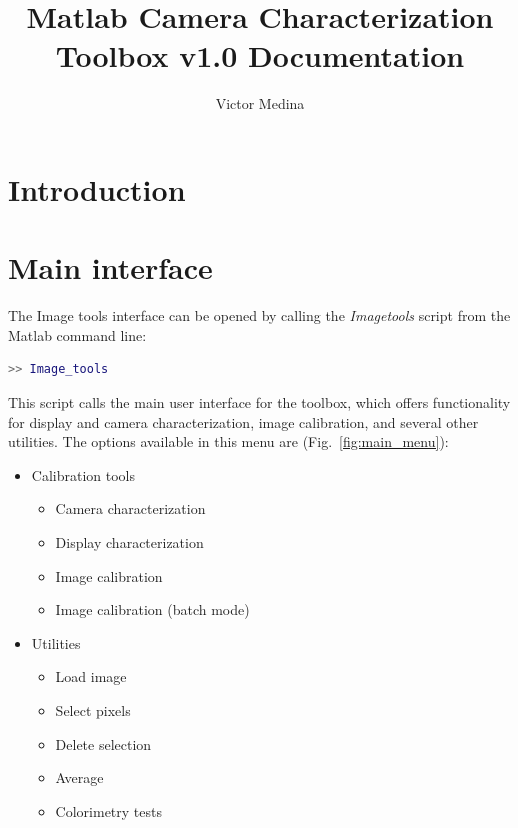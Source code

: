 \documentclass[a4paper,12pt,oneside]{article}
\begin{document}
\title{Matlab Camera Characterization Toolbox v1.0
	   \newline Documentation}
\author{Victor Medina}

\maketitle

\tableofcontents

\section{Introduction}


\section{Main interface}
The Image tools interface can be opened by calling the \textit{Image{\textunderscore}tools} script from the Matlab command line:

\begin{lstlisting}[language=matlab]
>> Image_tools
\end{lstlisting}

This script calls the main user interface for the toolbox, which offers functionality for display and camera characterization, image calibration, and several other utilities. The options available in this menu are (Fig.~\ref{fig:main_menu}):

\begin{itemize}
	\item Calibration tools
		\begin{itemize}
			\item Camera characterization
			\item Display characterization
			\item Image calibration
			\item Image calibration (batch mode)
		\end{itemize}
	
	\item Utilities
		\begin{itemize}
			\item Load image
			\item Select pixels
			\item Delete selection
			\item Average
			\item Colorimetry tests
		\end{itemize}
\end{itemize}
\end{document}
